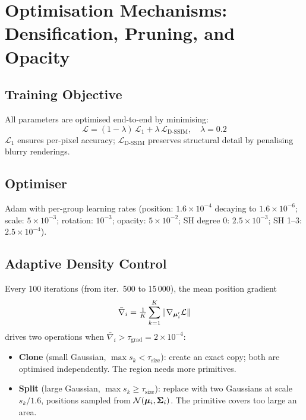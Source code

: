\section{Optimisation Mechanisms: Densification, Pruning, and Opacity}
\label{sec:optimization}

\subsection{Training Objective}

All parameters are optimised end-to-end by minimising:
\begin{equation}
  \boxed{
    \mathcal{L} = (1 - \lambda)\,\mathcal{L}_1 + \lambda\,\mathcal{L}_{\text{D-SSIM}}
  }, \quad \lambda = 0.2
\end{equation}
$\mathcal{L}_1$ ensures per-pixel accuracy; $\mathcal{L}_{\text{D-SSIM}}$
preserves structural detail by penalising blurry renderings.

\subsection{Optimiser}

Adam with per-group learning rates (position: $1.6\times10^{-4}$ decaying to
$1.6\times10^{-6}$; scale: $5\times10^{-3}$; rotation: $10^{-3}$; opacity:
$5\times10^{-2}$; SH degree 0: $2.5\times10^{-3}$; SH 1--3:
$2.5\times10^{-4}$).

\subsection{Adaptive Density Control}
\label{ssec:density}

Every 100 iterations (from iter.\ 500 to 15\,000), the mean position gradient
\begin{equation}
  \bar{\nabla}_i = \tfrac{1}{K}\sum_{k=1}^{K}\|\nabla_{\boldsymbol{\mu}'_i}\mathcal{L}\|
\end{equation}
drives two operations when $\bar{\nabla}_i > \tau_{\text{grad}} = 2\times10^{-4}$:

\begin{itemize}
  \item \textbf{Clone} (small Gaussian, $\max s_k < \tau_{\text{size}}$): create
        an exact copy; both are optimised independently. The region needs more
        primitives.
  \item \textbf{Split} (large Gaussian, $\max s_k \geq \tau_{\text{size}}$):
        replace with two Gaussians at scale $s_k/1.6$, positions sampled from
        $\mathcal{N}(\boldsymbol{\mu}_i, \boldsymbol{\Sigma}_i)$. The primitive covers too large an area.
\end{itemize}

